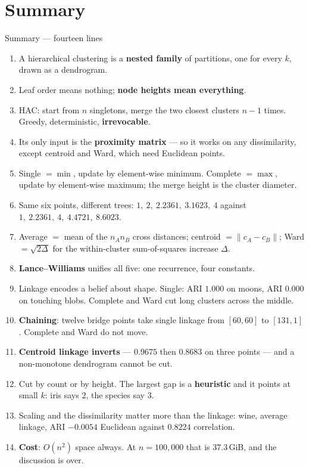 \documentclass[aspectratio=169]{beamer}
\begin{document}
\section{Summary}
\label{sec:summary}

\begin{frame}[shrink=14]{Summary --- fourteen lines}
  \begin{enumerate}\small
    \item A hierarchical clustering is a \textbf{nested family} of partitions,
      one for every $k$, drawn as a dendrogram.
    \item Leaf order means nothing; \textbf{node heights mean everything}.
    \item HAC: start from $n$ singletons, merge the two closest clusters
      $n-1$ times. Greedy, deterministic, \textbf{irrevocable}.
    \item Its only input is the \textbf{proximity matrix} --- so it works on
      any dissimilarity, except centroid and Ward, which need Euclidean
      points.
    \item Single $= \min$, update by element-wise minimum. Complete $= \max$,
      update by element-wise maximum; the merge height is the cluster
      diameter.
    \item Same six points, different trees: $1,\ 2,\ 2.2361,\ 3.1623,\ 4$
      against $1,\ 2.2361,\ 4,\ 4.4721,\ 8.6023$.
    \item Average $=$ mean of the $n_A n_B$ cross distances; centroid
      $= \lVert c_A - c_B\rVert$; Ward $= \sqrt{2\Delta}$ for the
      within-cluster sum-of-squares increase $\Delta$.
    \item \textbf{Lance--Williams} unifies all five: one recurrence, four
      constants.
    \item Linkage encodes a belief about shape. Single: ARI $1.000$ on moons,
      ARI $0.000$ on touching blobs. Complete and Ward cut long clusters
      across the middle.
    \item \textbf{Chaining}: twelve bridge points take single linkage from
      $[60,60]$ to $[131,1]$. Complete and Ward do not move.
    \item \textbf{Centroid linkage inverts} --- $0.9675$ then $0.8683$ on
      three points --- and a non-monotone dendrogram cannot be cut.
    \item Cut by count or by height. The largest gap is a \textbf{heuristic}
      and it points at small $k$: iris says $2$, the species say $3$.
    \item Scaling and the dissimilarity matter more than the linkage: wine,
      average linkage, ARI $-0.0054$ Euclidean against $0.8224$ correlation.
    \item \textbf{Cost}: $O(n^2)$ space always. At $n = 100{,}000$ that is
      $37.3$\,GiB, and the discussion is over.
  \end{enumerate}
\end{frame}
\end{document}
